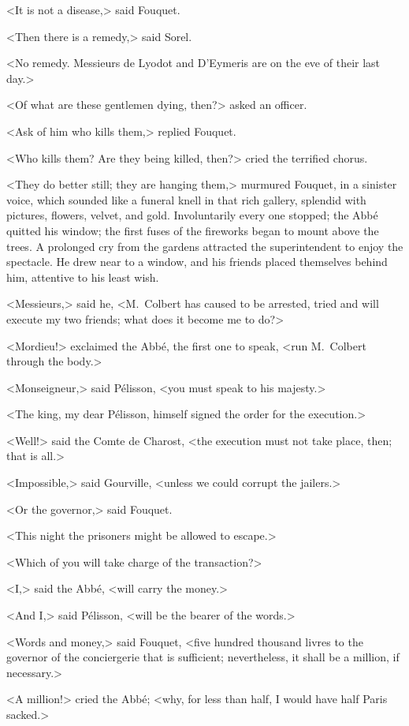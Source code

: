 <It is not a disease,> said Fouquet.

<Then there is a remedy,> said Sorel.

<No remedy. Messieurs de Lyodot and D'Eymeris are on the eve of their last day.>

<Of what are these gentlemen dying, then?> asked an officer.

<Ask of him who kills them,> replied Fouquet.

<Who kills them? Are they being killed, then?> cried the terrified chorus.

<They do better still; they are hanging them,> murmured Fouquet, in a sinister voice, which sounded like a funeral knell in that rich gallery, splendid with pictures, flowers, velvet, and gold. Involuntarily every one stopped; the Abbé quitted his window; the first fuses of the fireworks began to mount above the trees. A prolonged cry from the gardens attracted the superintendent to enjoy the spectacle. He drew near to a window, and his friends placed themselves behind him, attentive to his least wish.

<Messieurs,> said he, <M.~Colbert has caused to be arrested, tried and will execute my two friends; what does it become me to do?>

<Mordieu!> exclaimed the Abbé, the first one to speak, <run M.~Colbert through the body.>

<Monseigneur,> said Pélisson, <you must speak to his majesty.>

<The king, my dear Pélisson, himself signed the order for the execution.>

<Well!> said the Comte de Charost, <the execution must not take place, then; that is all.>

<Impossible,> said Gourville, <unless we could corrupt the jailers.>

<Or the governor,> said Fouquet.

<This night the prisoners might be allowed to escape.>

<Which of you will take charge of the transaction?>

<I,> said the Abbé, <will carry the money.>

<And I,> said Pélisson, <will be the bearer of the words.>

<Words and money,> said Fouquet, <five hundred thousand livres to the governor of the conciergerie that is sufficient; nevertheless, it shall be a million, if necessary.>

<A million!> cried the Abbé; <why, for less than half, I would have half Paris sacked.>

